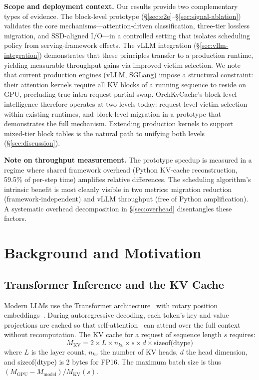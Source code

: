 \documentclass[conference]{IEEEtran}
\begin{document}
\textbf{Scope and deployment context.} Our results provide two complementary types of evidence. The block-level prototype (\S\ref{sec:e2e}--\S\ref{sec:signal-ablation}) validates the core mechanisms---attention-driven classification, three-tier lossless migration, and SSD-aligned I/O---in a controlled setting that isolates scheduling policy from serving-framework effects. The vLLM integration (\S\ref{sec:vllm-integration}) demonstrates that these principles transfer to a production runtime, yielding measurable throughput gains via improved victim selection. We note that current production engines (vLLM, SGLang) impose a structural constraint: their attention kernels require all KV blocks of a running sequence to reside on GPU, precluding true intra-request partial swap. OrchKvCache's block-level intelligence therefore operates at two levels today: request-level victim selection within existing runtimes, and block-level migration in a prototype that demonstrates the full mechanism. Extending production kernels to support mixed-tier block tables is the natural path to unifying both levels (\S\ref{sec:discussion}).

\textbf{Note on throughput measurement.} The prototype speedup is measured in a regime where shared framework overhead (Python KV-cache reconstruction, 59.5\% of per-step time) amplifies relative differences. The scheduling algorithm's intrinsic benefit is most cleanly visible in two metrics: migration reduction (framework-independent) and vLLM throughput (free of Python amplification). A systematic overhead decomposition in \S\ref{sec:overhead} disentangles these factors.

\section{Background and Motivation}
\subsection{Transformer Inference and the KV Cache}

Modern LLMs use the Transformer architecture~\cite{transformer} with rotary position embeddings~\cite{rope}. During autoregressive decoding, each token's key and value projections are cached so that self-attention~\cite{transformer} can attend over the full context without recomputation. The KV cache for a request of sequence length $s$ requires:
\begin{equation}
M_{\text{KV}} = 2 \times L \times n_{kv} \times s \times d \times \text{sizeof(dtype)}
\label{eq:kv-mem}
\end{equation}
where $L$ is the layer count, $n_{kv}$ the number of KV heads, $d$ the head dimension, and sizeof(dtype) is 2 bytes for FP16. The maximum batch size is thus $(M_{\text{GPU}} - M_{\text{model}}) / M_{\text{KV}}(s)$.
\end{document}
